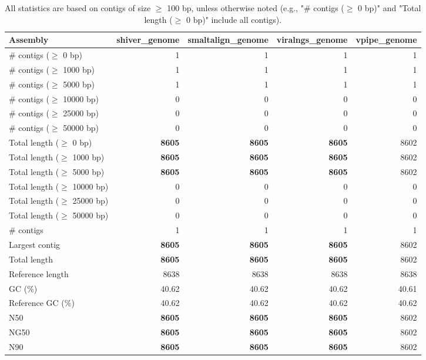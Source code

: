 \documentclass[12pt,a4paper]{article}
\begin{document}
\begin{table}[ht]
\begin{center}
\caption{All statistics are based on contigs of size $\geq$ 100 bp, unless otherwise noted (e.g., "\# contigs ($\geq$ 0 bp)" and "Total length ($\geq$ 0 bp)" include all contigs).}
\begin{tabular}{|l*{4}{|r}|}
\hline
Assembly & shiver\_genome & smaltalign\_genome & viralngs\_genome & vpipe\_genome \\ \hline
\# contigs ($\geq$ 0 bp) & 1 & 1 & 1 & 1 \\ \hline
\# contigs ($\geq$ 1000 bp) & 1 & 1 & 1 & 1 \\ \hline
\# contigs ($\geq$ 5000 bp) & 1 & 1 & 1 & 1 \\ \hline
\# contigs ($\geq$ 10000 bp) & 0 & 0 & 0 & 0 \\ \hline
\# contigs ($\geq$ 25000 bp) & 0 & 0 & 0 & 0 \\ \hline
\# contigs ($\geq$ 50000 bp) & 0 & 0 & 0 & 0 \\ \hline
Total length ($\geq$ 0 bp) & {\bf 8605} & {\bf 8605} & {\bf 8605} & 8602 \\ \hline
Total length ($\geq$ 1000 bp) & {\bf 8605} & {\bf 8605} & {\bf 8605} & 8602 \\ \hline
Total length ($\geq$ 5000 bp) & {\bf 8605} & {\bf 8605} & {\bf 8605} & 8602 \\ \hline
Total length ($\geq$ 10000 bp) & 0 & 0 & 0 & 0 \\ \hline
Total length ($\geq$ 25000 bp) & 0 & 0 & 0 & 0 \\ \hline
Total length ($\geq$ 50000 bp) & 0 & 0 & 0 & 0 \\ \hline
\# contigs & 1 & 1 & 1 & 1 \\ \hline
Largest contig & {\bf 8605} & {\bf 8605} & {\bf 8605} & 8602 \\ \hline
Total length & {\bf 8605} & {\bf 8605} & {\bf 8605} & 8602 \\ \hline
Reference length & 8638 & 8638 & 8638 & 8638 \\ \hline
GC (\%) & 40.62 & 40.62 & 40.62 & 40.61 \\ \hline
Reference GC (\%) & 40.62 & 40.62 & 40.62 & 40.62 \\ \hline
N50 & {\bf 8605} & {\bf 8605} & {\bf 8605} & 8602 \\ \hline
NG50 & {\bf 8605} & {\bf 8605} & {\bf 8605} & 8602 \\ \hline
N90 & {\bf 8605} & {\bf 8605} & {\bf 8605} & 8602 \\ \hline

\end{tabular}
\end{center}
\end{table}
\end{document}
